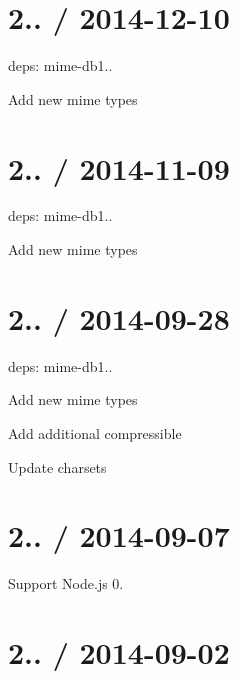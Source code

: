 \section*{2.. / 2014-\/12-\/10 }


\begin{DoxyItemize}
\item deps\+: mime-\/db1..
\begin{DoxyItemize}
\item Add new mime types
\end{DoxyItemize}
\end{DoxyItemize}

\section*{2.. / 2014-\/11-\/09 }


\begin{DoxyItemize}
\item deps\+: mime-\/db1..
\begin{DoxyItemize}
\item Add new mime types
\end{DoxyItemize}
\end{DoxyItemize}

\section*{2.. / 2014-\/09-\/28 }


\begin{DoxyItemize}
\item deps\+: mime-\/db1..
\begin{DoxyItemize}
\item Add new mime types
\item Add additional compressible
\item Update charsets
\end{DoxyItemize}
\end{DoxyItemize}

\section*{2.. / 2014-\/09-\/07 }


\begin{DoxyItemize}
\item Support Node.\+js 0.
\end{DoxyItemize}

\section*{2.. / 2014-\/09-\/02 }


